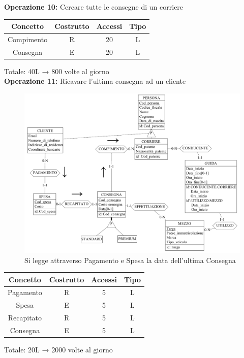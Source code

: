\documentclass[a4paper,12pt]{report}
\begin{document}
\textbf{Operazione 10:}
Cercare tutte le consegne di un corriere\\
\begin{center}
    \begin{tabular}{ | c   c   c   c | } 
    \hline
	Concetto&Costrutto&Accessi&Tipo\\
	\hline
	Compimento&R&20&L\\
	\hline
    Consegna&E&20&L\\
	\hline
	\end{tabular}
\end{center}
Totale: 40L → 800 volte al giorno\\
\textbf{Operazione 11:}
Ricavare l'ultima consegna ad un cliente\\
\begin{figure}[H]
	\centering{}
	\includegraphics[width=\textwidth]{img/Operazione5.pdf}
	\caption{Si legge attraverso Pagamento e Spesa la data dell'ultima Consegna}
\end{figure}
\begin{center}
    \begin{tabular}{ | c   c   c   c | } 
    \hline
	Concetto&Costrutto&Accessi&Tipo\\
	\hline
	Pagamento&R&5&L\\
	\hline
    Spesa&E&5&L\\
	\hline
	Recapitato&R&5&L\\
	\hline
	Consegna&E&5&L\\
	\hline
	\end{tabular}
\end{center}
Totale: 20L → 2000 volte al giorno\\
\end{document}
